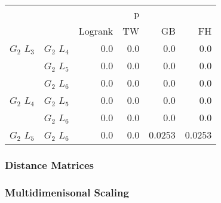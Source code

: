       \begin{table}
        \centering
        \begin{tabular}{llrrrr}
          \toprule
                       &             &         &  p &    &     \\
          \cmidrule{3-6}
                       &             & Logrank & TW & GB & FH  \\
          \midrule
          $G_2$ $L_3$  & $G_2$ $L_4$  &  0.0 &  0.0 &  0.0 &  0.0     \\
                       & $G_2$ $L_5$  & 0.0 & 0.0 & 0.0 & 0.0    \\
                       & $G_2$ $L_6$  & 0.0 & 0.0 & 0.0 & 0.0      \\
          $G_2$ $L_4$  & $G_2$ $L_5$  & 0.0 & 0.0 & 0.0 & 0.0      \\
                       & $G_2$ $L_6$  & 0.0 & 0.0 & 0.0 & 0.0       \\
          $G_2$ $L_5$   & $G_2$ $L_6$ & 0.0 & 0.0 & 0.0253 & 0.0253      \\
          \bottomrule
        \end{tabular}
        \label{tab:g2_ingroup_tests_radius}
        \caption{}
      \end{table}


      \subsubsection{Distance Matrices}


      \subsubsection{Multidimenisonal Scaling}

















